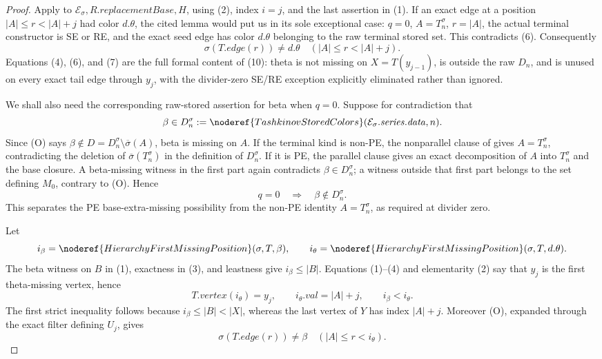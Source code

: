 \begin{proof}
Apply  to
$\mathcal E_\sigma,R.\mathit{replacementBase},H$, using (2), index
$i=j$, and the last assertion in (1).  If an exact edge at a position
$|A|\le r<|A|+j$ had color $d.\theta$, the cited lemma would put us in
its sole exceptional case: $q=0$, $A=T_n^\sigma$, $r=|A|$, the
actual terminal constructor is SE or RE, and the exact seed edge has
color $d.\theta$ belonging to the raw terminal stored set.  This
contradicts (6).  Consequently
\[
 \sigma(T.\mathit{edge}(r))\ne d.\theta
       \quad(|A|\le r<|A|+j).                                  \tag{7}
\]
Equations (4), (6), and (7) are the full formal content of (10): theta
is not missing on $X=T(y_{j-1})$, is outside the raw $D_n$, and is
unused on every exact tail edge through $y_j$, with the divider-zero
SE/RE exception explicitly eliminated rather than ignored.

We shall also need the corresponding raw-stored assertion for beta when
$q=0$.  Suppose for contradiction that
\[
 \beta\in D_n^\sigma:=\noderef{TashkinovStoredColors}
    (\mathcal E_\sigma.\mathit{series.data},n).
\]
Since (O) says
$\beta\notin D=D_n^\sigma\setminus\overline\sigma(A)$, beta is missing
on $A$.  If the terminal kind is non-PE, the nonparallel clause of
 gives $A=T_n^\sigma$, contradicting the
deletion of $\overline\sigma(T_n^\sigma)$ in the definition of
$D_n^\sigma$.  If it is PE, the parallel clause gives an exact
 decomposition of $A$ into $T_n^\sigma$
and the base closure.  A beta-missing witness in the first part again
contradicts $\beta\in D_n^\sigma$; a witness outside that first part
belongs to the set defining $M_0$, contrary to (O).  Hence
\[
        q=0\quad\Longrightarrow\quad \beta\notin D_n^\sigma.   \tag{8}
\]
This separates the PE base-extra-missing possibility from the non-PE
identity $A=T_n^\sigma$, as required at divider zero.

Let
\[
 i_\beta=\noderef{HierarchyFirstMissingPosition}(\sigma,T,\beta),
 \qquad
 i_\theta=\noderef{HierarchyFirstMissingPosition}
                 (\sigma,T,d.\theta).
\]
The beta witness on $B$ in (1), exactness in (3), and leastness give
$i_\beta\le |B|$.  Equations (1)--(4) and elementarity (2) say that
$y_j$ is the first theta-missing vertex, hence
\[
 T.\mathit{vertex}(i_\theta)=y_j,\qquad
 i_\theta.\mathit{val}=|A|+j,\qquad i_\beta<i_\theta.          \tag{9}
\]
The first strict inequality follows because $i_\beta\le|B|<|X|$,
whereas the last vertex of $Y$ has index $|A|+j$.  Moreover (O),
expanded through the exact filter defining $U_j$, gives
\[
 \sigma(T.\mathit{edge}(r))\ne\beta
       \quad(|A|\le r<i_\theta).                              \tag{10}
\]


\end{proof}

